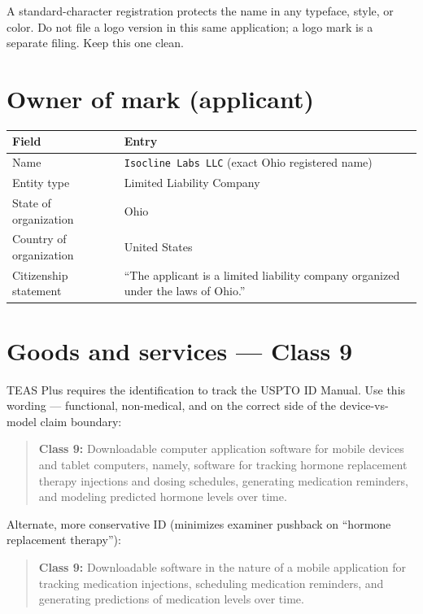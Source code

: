 \documentclass[11pt,a4paper]{article}
\newcommand{\code}[1]{\texttt{\small #1}}
\begin{document}
\noindent
A standard-character registration protects the name in any typeface, style, or
color. Do not file a logo version in this same application; a logo mark is a
separate filing. Keep this one clean.

\section{Owner of mark (applicant)}

\begin{center}
\begin{tabular}{@{}L{4.4cm}L{11.6cm}@{}}
\toprule
\textbf{Field} & \textbf{Entry} \\
\midrule
Name & \code{Isocline Labs LLC} (exact Ohio registered name) \\
Entity type & Limited Liability Company \\
State of organization & Ohio \\
Country of organization & United States \\
Citizenship statement & ``The applicant is a limited liability company
organized under the laws of Ohio.'' \\
\bottomrule
\end{tabular}
\end{center}

\section{Goods and services --- Class 9}

TEAS Plus requires the identification to track the USPTO ID Manual. Use this
wording --- functional, non-medical, and on the correct side of the
device-vs-model claim boundary:

\begin{quote}\small
\textbf{Class 9:} Downloadable computer application software for mobile devices
and tablet computers, namely, software for tracking hormone replacement therapy
injections and dosing schedules, generating medication reminders, and modeling
predicted hormone levels over time.
\end{quote}

\noindent
Alternate, more conservative ID (minimizes examiner pushback on ``hormone
replacement therapy''):

\begin{quote}\small
\textbf{Class 9:} Downloadable software in the nature of a mobile application
for tracking medication injections, scheduling medication reminders, and
generating predictions of medication levels over time.
\end{quote}
\end{document}
